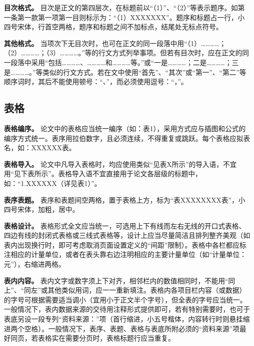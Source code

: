 \documentclass[doublesided]{Style/ucasthesis}%
\begin{document}
\textbf{目次格式。} 目次是正文的第四层次，在标题前以``（1）''、``（2）''等表示题序。如第一条第一款第一项第一目则标示为：``（1）XXXXXXX''。题序和标题占一行，小四号宋体，行首空两格，题序和标题之间不加标点，结尾处无标点符号。

\textbf{其他格式。} 当项次下无目次时，也可在正文的同一段落中用``（1）\ldots{}\ldots{}\ldots{}\ldots{}；（2）\ldots{}\ldots{}\ldots{}\ldots{}；（3）\ldots{}\ldots{}\ldots{}\ldots{}。''等的行文方式列举事项。但若有目次时，应在正文的同一段落中采用``包括\ldots{}\ldots{}\ldots{}\ldots{}、\ldots{}\ldots{}\ldots{}\ldots{}和\ldots{}\ldots{}\ldots{}\ldots{}等。''或``一是\ldots{}\ldots{}\ldots{}\ldots{}；二是\ldots{}\ldots{}\ldots{}\ldots{}；三是\ldots{}\ldots{}\ldots{}\ldots{}。''等类似的行文方式。若在文中使用``首先''、``其次''或``第一''、``第二''等顺序词时，其后不能使用顿号：``、''，而必须使用逗号：``，''。

\hypertarget{section-28}{%
\subsection{表格}\label{section-28}}

\textbf{表格编序。} 论文中的表格应当统一编序（如：表1），采用方式应与插图和公式的编序方式统一。表序用拉伯数字，且必须连续，不得重复或跳跃。每个表格应拟表名，如：XXXXXX表。

\textbf{表格导入。} 论文中凡导入表格时，均应使用类似``见表X所示''的导入语，不宜用``见下表所示''。表格导入语不宜直接用于论文各层级的标题中，如：``1.XXXXXX（详见表1）''。

\textbf{表序表题。} 表序和表题间空两格，置于表格上方，标为``表XXXXXXXX表''，小四号宋体，加粗，居中。

\textbf{表格设计。} 表格形式全文应当统一，可选用上下有线而左右无线的开口式表格、四边有线的封闭式表格或三线式表格等，设计上应当尽量简洁且排列整齐美观（如表内出现换行时，即可考虑取消页面设置定义的``间距''限制）。表格中各栏都应标注相应的计量单位，或者在表头靠右边注明相应的主要计量单位（如``计量单位：元''），右缩进两格。

\textbf{表内内容。} 表内文字或数字须上下对齐，相邻栏内的数值相同时，不能用``同上''、``同左''或其他类似用词，应一一重新填注。表格内各项目栏内容（或数据）的字号可根据需要适当调小（宜用小于正文半个字号），但全表的字号应当统一。一般情况下，表内数据来源的交待用注释形式提供即可，若有特别需要时，也可于表底另设一段专列``资料来源：''项（首行缩进，小五号楷体，内容转行时则悬挂缩进两个空格）。一般情况下，表序、表题、表格与表底所附必须的``资料来源''项最好同页，若表格实在需要分页时，表格标题行应当重复。
\end{document}
